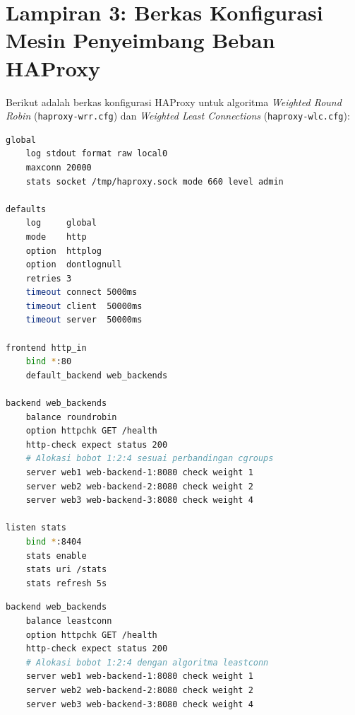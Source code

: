\newpage

\section*{Lampiran 3: Berkas Konfigurasi Mesin Penyeimbang Beban HAProxy}

Berikut adalah berkas konfigurasi HAProxy untuk algoritma \textit{Weighted Round Robin} (\texttt{haproxy-wrr.cfg}) dan \textit{Weighted Least Connections} (\texttt{haproxy-wlc.cfg}):

\begin{lstlisting}[language=bash, caption={Konfigurasi haproxy-wrr.cfg (Weighted Round Robin)}]
global
    log stdout format raw local0
    maxconn 20000
    stats socket /tmp/haproxy.sock mode 660 level admin

defaults
    log     global
    mode    http
    option  httplog
    option  dontlognull
    retries 3
    timeout connect 5000ms
    timeout client  50000ms
    timeout server  50000ms

frontend http_in
    bind *:80
    default_backend web_backends

backend web_backends
    balance roundrobin
    option httpchk GET /health
    http-check expect status 200
    # Alokasi bobot 1:2:4 sesuai perbandingan cgroups
    server web1 web-backend-1:8080 check weight 1
    server web2 web-backend-2:8080 check weight 2
    server web3 web-backend-3:8080 check weight 4

listen stats
    bind *:8404
    stats enable
    stats uri /stats
    stats refresh 5s
\end{lstlisting}

\vspace{0.4cm}

\begin{lstlisting}[language=bash, caption={Konfigurasi haproxy-wlc.cfg (Weighted Least Connections)}]
backend web_backends
    balance leastconn
    option httpchk GET /health
    http-check expect status 200
    # Alokasi bobot 1:2:4 dengan algoritma leastconn
    server web1 web-backend-1:8080 check weight 1
    server web2 web-backend-2:8080 check weight 2
    server web3 web-backend-3:8080 check weight 4
\end{lstlisting}

\newpage

